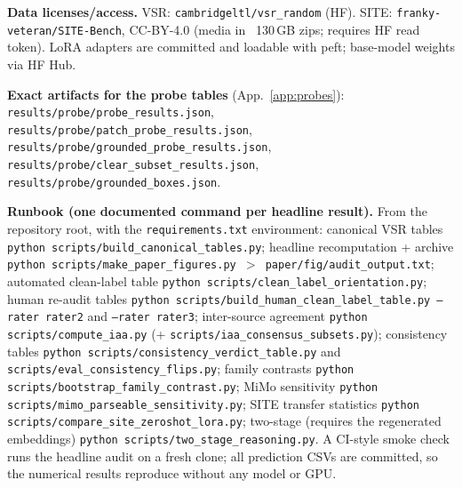 \textbf{Data licenses/access.} VSR: \texttt{cambridgeltl/vsr\_random} (HF).
SITE: \texttt{franky-veteran/SITE-Bench}, CC-BY-4.0 (media in ~130\,GB zips;
requires HF read token). LoRA adapters are committed and loadable with peft;
base-model weights via HF Hub.

\textbf{Exact artifacts for the probe tables} (App.~\ref{app:probes}):
\texttt{results/probe/probe\_results.json},
\texttt{results/probe/patch\_probe\_results.json},
\texttt{results/probe/grounded\_probe\_results.json},
\texttt{results/probe/clear\_subset\_results.json},
\texttt{results/probe/grounded\_boxes.json}.

\textbf{Runbook (one documented command per headline result).} From the
repository root, with the \texttt{requirements.txt} environment:
canonical VSR tables \texttt{python scripts/build\_canonical\_tables.py};
headline recomputation + archive \texttt{python scripts/make\_paper\_figures.py
$>$ paper/fig/audit\_output.txt}; automated clean-label table
\texttt{python scripts/clean\_label\_orientation.py}; human re-audit tables
\texttt{python scripts/build\_human\_clean\_label\_table.py --rater rater2}
and \texttt{--rater rater3}; inter-source agreement
\texttt{python scripts/compute\_iaa.py} (+ \texttt{scripts/iaa\_consensus\_subsets.py});
consistency tables \texttt{python scripts/consistency\_verdict\_table.py} and
\texttt{scripts/eval\_consistency\_flips.py}; family contrasts
\texttt{python scripts/bootstrap\_family\_contrast.py}; MiMo sensitivity
\texttt{python scripts/mimo\_parseable\_sensitivity.py}; SITE transfer
statistics \texttt{python scripts/compare\_site\_zeroshot\_lora.py};
two-stage (requires the regenerated embeddings)
\texttt{python scripts/two\_stage\_reasoning.py}. A CI-style smoke check runs
the headline audit on a fresh clone; all prediction CSVs are committed, so
the numerical results reproduce without any model or GPU.
